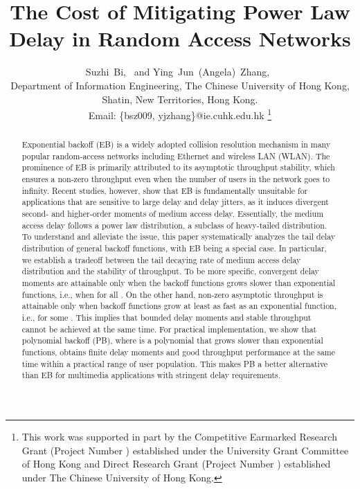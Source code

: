 \documentclass[journal]{IEEEtran}
\begin{document}
\title{The Cost of Mitigating Power Law Delay in Random Access Networks}

\author{Suzhi~Bi,~ and Ying~Jun~(Angela)~Zhang,~\\
Department of Information Engineering, The Chinese University of Hong
        Kong,\\Shatin, New Territories, Hong Kong. \\ Email: \{bsz009, yjzhang\}@ie.cuhk.edu.hk
        \thanks{This work was supported in part by the Competitive Earmarked Research Grant (Project Number ) established under the University Grant Committee of Hong Kong and Direct Research Grant (Project Number ) established under The Chinese University of Hong Kong.}}
\maketitle
\vspace{-0.7in}
\begin{abstract}
Exponential backoff (EB) is a widely adopted collision resolution mechanism in many popular random-access networks including Ethernet and wireless LAN (WLAN). The prominence of EB is primarily attributed to its asymptotic throughput stability, which ensures a non-zero throughput even when the number of users in the network goes to infinity. Recent studies, however, show that EB is fundamentally unsuitable for applications that are sensitive to large delay and delay jitters, as it induces divergent second- and higher-order moments of medium access delay. Essentially, the medium access delay follows a power law distribution, a subclass of heavy-tailed distribution. To understand and alleviate the issue, this paper systematically analyzes the tail delay distribution of general backoff functions, with EB being a special case. In particular, we establish a tradeoff between the tail decaying rate of medium access delay distribution and the stability of throughput. To be more specific, convergent delay moments are attainable only when the backoff functions  grows slower than exponential functions, i.e., when  for all . On the other hand, non-zero asymptotic throughput is attainable only when backoff functions grow at least as fast as an exponential function, i.e.,  for some . This implies that bounded delay moments and stable throughput cannot be achieved at the same time. For practical implementation, we show that polynomial backoff (PB), where  is a polynomial that grows slower than exponential functions, obtains finite delay moments and good throughput performance at the same time within a practical range of user population. This makes PB a better alternative than EB for multimedia applications with stringent delay requirements.
\end{abstract}
\end{document}
